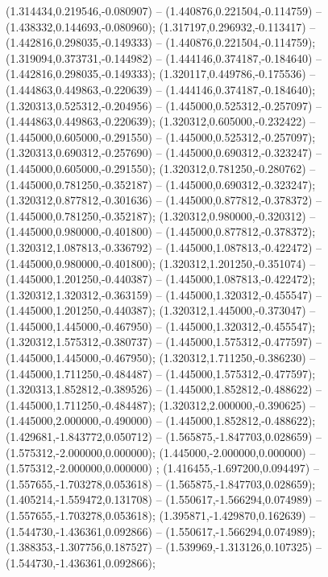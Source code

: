  (1.314434,0.219546,-0.080907) -- (1.440876,0.221504,-0.114759) -- (1.438332,0.144693,-0.080960);
 (1.317197,0.296932,-0.113417) -- (1.442816,0.298035,-0.149333) -- (1.440876,0.221504,-0.114759);
 (1.319094,0.373731,-0.144982) -- (1.444146,0.374187,-0.184640) -- (1.442816,0.298035,-0.149333);
 (1.320117,0.449786,-0.175536) -- (1.444863,0.449863,-0.220639) -- (1.444146,0.374187,-0.184640);
 (1.320313,0.525312,-0.204956) -- (1.445000,0.525312,-0.257097) -- (1.444863,0.449863,-0.220639);
 (1.320312,0.605000,-0.232422) -- (1.445000,0.605000,-0.291550) -- (1.445000,0.525312,-0.257097);
 (1.320313,0.690312,-0.257690) -- (1.445000,0.690312,-0.323247) -- (1.445000,0.605000,-0.291550);
 (1.320312,0.781250,-0.280762) -- (1.445000,0.781250,-0.352187) -- (1.445000,0.690312,-0.323247);
 (1.320312,0.877812,-0.301636) -- (1.445000,0.877812,-0.378372) -- (1.445000,0.781250,-0.352187);
 (1.320312,0.980000,-0.320312) -- (1.445000,0.980000,-0.401800) -- (1.445000,0.877812,-0.378372);
 (1.320312,1.087813,-0.336792) -- (1.445000,1.087813,-0.422472) -- (1.445000,0.980000,-0.401800);
 (1.320312,1.201250,-0.351074) -- (1.445000,1.201250,-0.440387) -- (1.445000,1.087813,-0.422472);
 (1.320312,1.320312,-0.363159) -- (1.445000,1.320312,-0.455547) -- (1.445000,1.201250,-0.440387);
 (1.320312,1.445000,-0.373047) -- (1.445000,1.445000,-0.467950) -- (1.445000,1.320312,-0.455547);
 (1.320312,1.575312,-0.380737) -- (1.445000,1.575312,-0.477597) -- (1.445000,1.445000,-0.467950);
 (1.320312,1.711250,-0.386230) -- (1.445000,1.711250,-0.484487) -- (1.445000,1.575312,-0.477597);
 (1.320313,1.852812,-0.389526) -- (1.445000,1.852812,-0.488622) -- (1.445000,1.711250,-0.484487);
 (1.320312,2.000000,-0.390625) -- (1.445000,2.000000,-0.490000) -- (1.445000,1.852812,-0.488622);
 (1.429681,-1.843772,0.050712) -- (1.565875,-1.847703,0.028659) -- (1.575312,-2.000000,0.000000);
 (1.445000,-2.000000,0.000000) -- (1.575312,-2.000000,0.000000) ;
 (1.416455,-1.697200,0.094497) -- (1.557655,-1.703278,0.053618) -- (1.565875,-1.847703,0.028659);
 (1.405214,-1.559472,0.131708) -- (1.550617,-1.566294,0.074989) -- (1.557655,-1.703278,0.053618);
 (1.395871,-1.429870,0.162639) -- (1.544730,-1.436361,0.092866) -- (1.550617,-1.566294,0.074989);
 (1.388353,-1.307756,0.187527) -- (1.539969,-1.313126,0.107325) -- (1.544730,-1.436361,0.092866);
